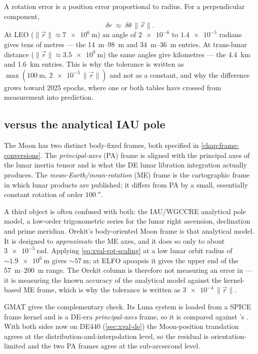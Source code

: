 A rotation error is a position error proportional to radius. For a
perpendicular component,
\begin{equation}
  \label{eq:xval-rot-scaling}
  \delta r \;\approx\; \delta\theta \, \lVert\vec r\rVert .
\end{equation}
At LEO ($\lVert\vec r\rVert \approx \SI{7e6}{\meter}$) an angle of
$\num{2e-6}$ to $\num{1.4e-5}$ radians gives tens of metres --- the
\SIrange{14}{98}{\meter} and \SIrange{34}{36}{\meter} entries. At trans-lunar
distance ($\lVert\vec r\rVert \approx \SI{3.5e8}{\meter}$) the same angles
give kilometres --- the \SI{4.4}{\kilo\meter} and \SI{1.6}{\kilo\meter}
entries. This is why the tolerance is written as
$\max(\SI{100}{\meter},\, \num{2e-5}\,\lVert\vec r\rVert)$ and not as a
constant, and why the difference grows toward 2025 epochs, where one or both
tables have crossed from measurement into prediction.

\subsection{ versus the analytical IAU pole}
\label{sec:xval-moon}

The Moon has two distinct body-fixed frames, both specified in
\cref{chap:frame-conversions}. The \emph{principal-axes} (PA) frame is aligned
with the principal axes of the lunar inertia tensor and is what the DE lunar
libration integration actually produces. The \emph{mean-Earth/mean-rotation}
(ME) frame is the cartographic frame in which lunar products are published;
it differs from PA by a small, essentially constant rotation of order
$\SI{100}{\arcsecond}$.

A third object is often confused with both: the IAU/WGCCRE analytical pole
model, a low-order trigonometric series for the lunar right ascension,
declination and prime meridian. Orekit's body-oriented Moon frame is that
analytical model. It is designed to \emph{approximate} the ME axes, and it
does so only to about $\SI{3e-5}{\radian}$. Applying
\cref{eq:xval-rot-scaling} at a low lunar orbit radius of
${\sim}\SI{1.9e6}{\meter}$ gives ${\sim}\SI{57}{\meter}$; at ELFO apoapsis it
gives the upper end of the \SIrange{57}{200}{\meter} range. The Orekit column
is therefore not measuring an error in \lupnt{} --- it is measuring the known
accuracy of the analytical model against the kernel-based ME frame, which is
why the tolerance is written as $\num{3e-4}\,\lVert\vec r\rVert$.

GMAT gives the complementary check. Its Luna  system is loaded
from a SPICE frame kernel and is a DE-era \emph{principal-axes} frame, so it
is compared against \lupnt{}'s . With both sides now on DE440
(\cref{sec:xval-de}) the Moon-position translation agrees at the
distribution-and-interpolation level, so the residual is orientation-limited
and the two PA frames agree at the sub-arcsecond level.

